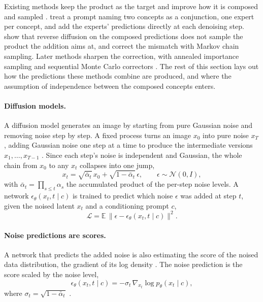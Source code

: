 \documentclass{article} %
\begin{document}
Existing methods keep the product as the target and improve how it is composed and sampled \citep{dutta2026steer, huang2026factordiff, wang2026testtime}. \citet{liu2022compositional} treat a prompt naming two concepts as a conjunction, one expert per concept, and add the experts' predictions directly at each denoising step. \citet{du2023reduce} show that reverse diffusion on the composed predictions does not sample the product the addition aims at, and correct the mismatch with Markov chain sampling. Later methods sharpen the correction, with annealed importance sampling \citep{zhang2025product} and sequential Monte Carlo correctors \citep{skreta2024superdiff, skreta2025feynman}. The rest of this section lays out how the predictions these methods combine are produced, and where the assumption of independence between the composed concepts enters.

\paragraph{Diffusion models.} A diffusion model generates an image by starting from pure Gaussian noise and removing noise step by step. A fixed process turns an image $x_0$ into pure noise $x_T$, adding Gaussian noise one step at a time to produce the intermediate versions $x_1, \dots, x_{T-1}$ \citep{sohldickstein2015deep, ho2020denoising}. Since each step's noise is independent and Gaussian, the whole chain from $x_0$ to any $x_t$ collapses into one jump,
\begin{equation}
x_t = \sqrt{\bar\alpha_t}\, x_0 + \sqrt{1-\bar\alpha_t}\,\epsilon, \qquad \epsilon \sim \mathcal{N}(0, I),
\label{eq:forward}
\end{equation}
with $\bar\alpha_t = \prod_{s\le t}\alpha_s$ the accumulated product of the per-step noise levels. A network $\epsilon_\theta(x_t, t \mid c)$ is trained to predict which noise $\epsilon$ was added at step $t$, given the noised latent $x_t$ and a conditioning prompt $c$,
\begin{equation}
\mathcal{L} = \mathbb{E}\,\lVert \epsilon - \epsilon_\theta(x_t, t \mid c) \rVert^2.
\label{eq:objective}
\end{equation}

\paragraph{Noise predictions are scores.} A network that predicts the added noise is also estimating the score of the noised data distribution, the gradient of its log density \citep{song2021scorebased}. The noise prediction is the score scaled by the noise level,
\begin{equation}
\epsilon_\theta(x_t, t \mid c) = -\sigma_t\, \nabla_{x_t} \log p_\theta(x_t \mid c),
\label{eq:score}
\end{equation}
where $\sigma_t = \sqrt{1-\bar\alpha_t}$ \citep{dhariwal2021diffusion}.
\end{document}
